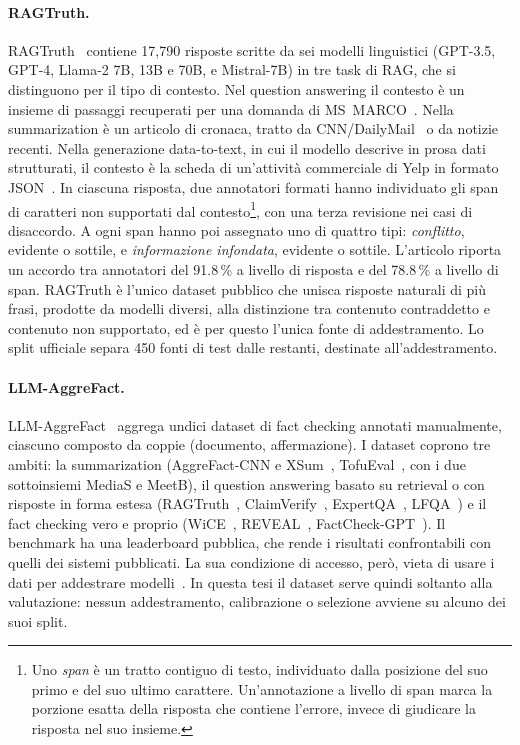\paragraph{RAGTruth.} RAGTruth~\cite{niu2024ragtruth} contiene 17{,}790 risposte scritte da sei modelli linguistici
(GPT-3.5, GPT-4, Llama-2 7B, 13B e 70B, e Mistral-7B) in tre task di RAG, che si distinguono per il tipo di contesto.
Nel question answering il contesto è un insieme di passaggi recuperati per una domanda di MS~MARCO~\cite{nguyen2016msmarco}.
Nella summarization è un articolo di cronaca, tratto da CNN/DailyMail~\cite{hermann2015teaching,see2017pointer} o da
notizie recenti. Nella generazione data-to-text, in cui il modello descrive in prosa dati strutturati, il contesto è la
scheda di un'attività commerciale di Yelp in formato JSON~\cite{yelpdataset}. In ciascuna risposta, due annotatori
formati hanno individuato gli span di caratteri non supportati dal contesto\footnote{Uno \emph{span} è un tratto
contiguo di testo, individuato dalla posizione del suo primo e del suo ultimo carattere. Un'annotazione a livello di span
marca la porzione esatta della risposta che contiene l'errore, invece di giudicare la risposta nel suo insieme.}, con una
terza revisione nei casi di disaccordo. A ogni span hanno poi assegnato uno di quattro tipi: \emph{conflitto}, evidente o
sottile, e \emph{informazione infondata}, evidente o sottile. L'articolo riporta un accordo tra annotatori del 91.8\,\% a
livello di risposta e del 78.8\,\% a livello di span. RAGTruth è l'unico dataset pubblico che unisca risposte naturali di
più frasi, prodotte da modelli diversi, alla distinzione tra contenuto contraddetto e contenuto non supportato, ed è per
questo l'unica fonte di addestramento. Lo split ufficiale separa 450 fonti di test dalle restanti, destinate
all'addestramento.

\paragraph{LLM-AggreFact.} LLM-AggreFact~\cite{tang2024minicheck,llmaggrefact} aggrega undici dataset di fact checking
annotati manualmente, ciascuno composto da coppie (documento, affermazione). I dataset coprono tre ambiti: la
summarization (AggreFact-CNN e XSum~\cite{tang2023aggrefact}, TofuEval~\cite{tang2024tofueval}, con i due sottoinsiemi MediaS e MeetB), il question answering
basato su retrieval o con risposte in forma estesa (RAGTruth~\cite{niu2024ragtruth}, ClaimVerify~\cite{liu2023verifiability},
ExpertQA~\cite{malaviya2024expertqa}, LFQA~\cite{chen2024lfqa}) e il fact checking vero e proprio
(WiCE~\cite{kamoi2023wice}, REVEAL~\cite{jacovi2024reveal}, FactCheck-GPT~\cite{wang2024factcheckbench}). Il benchmark
ha una leaderboard pubblica, che rende i risultati confrontabili con quelli dei sistemi pubblicati. La sua condizione di accesso, però, vieta di usare i dati per addestrare modelli~\cite{hf_llmaggrefact}. In questa tesi il dataset serve quindi
soltanto alla valutazione: nessun addestramento, calibrazione o selezione avviene su alcuno dei suoi split.

